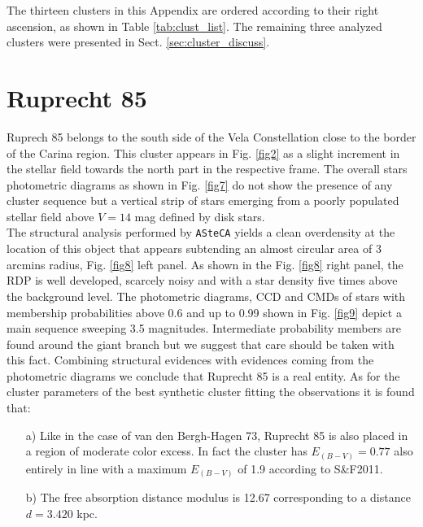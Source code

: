 \documentclass{aa}
\begin{document}
\appendix

The thirteen clusters in this Appendix are ordered according to their right
ascension, as shown in Table \ref{tab:clust_list}. The remaining three analyzed
clusters were presented in Sect. \ref{sec:cluster_discuss}.

\section{Ruprecht 85}

Ruprech 85 belongs to the south side of the Vela Constellation close to the
border of the Carina region. This cluster appears in Fig. \ref{fig2} as a slight
increment in the stellar field towards the north part in the respective frame.
The overall stars photometric diagrams as shown in Fig. \ref{fig7} do not show
the presence of any cluster sequence but a vertical strip of stars emerging from
a poorly populated stellar field above $V= 14$ mag defined by disk stars.\\

The structural analysis performed by \texttt{ASteCA} yields a clean overdensity
at the location of this object that appears subtending an almost circular area
of 3 arcmins radius, Fig. \ref{fig8} left panel. As shown in the Fig. \ref{fig8}
right panel, the RDP is well developed, scarcely noisy and with a star density
five times above the background level. The photometric diagrams, CCD and CMDs of
stars with membership probabilities above 0.6 and up to 0.99 shown in Fig.
\ref{fig9} depict a main sequence sweeping 3.5 magnitudes. Intermediate
probability members are found around the giant branch but we suggest that
care should be taken with this fact. Combining structural evidences with
evidences coming from the
photometric diagrams we conclude that Ruprecht 85 is a real entity. As for the
cluster parameters of the best synthetic cluster fitting the observations it is
found that:

\begin{itemize}
\item [a)] Like in the case of van den Bergh-Hagen 73, Ruprecht 85 is also placed
    in a region of moderate color excess. In fact the cluster has $E_{(B-V)} =
    0.77$ also entirely in line with a maximum $E_{(B-V)}$ of 1.9 according to 
    S\&F2011.
\item [b)] The free absorption distance modulus is 12.67 corresponding to a
    distance $d = 3.420$ kpc.
\end{itemize}
\end{document}
